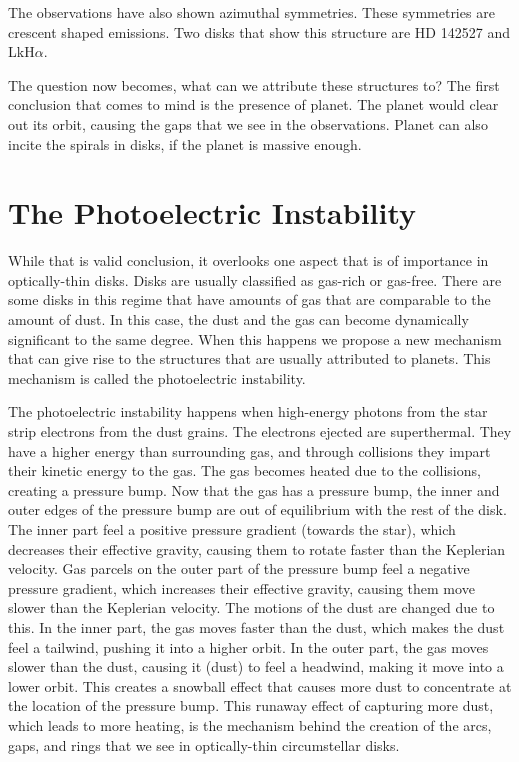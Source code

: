 \documentclass[onecolumn]{report}
\begin{document}
The observations have also shown azimuthal symmetries. These symmetries are crescent shaped emissions. Two disks that show this structure are HD 142527 and LkH$\alpha$. 

The question now becomes, what can we attribute these structures to? The first conclusion that comes to mind is the presence of planet. The planet would clear out its orbit, causing the gaps that we see in the observations. Planet can also incite the spirals in disks, if the planet is massive enough.

\section{The Photoelectric Instability}

While that is valid conclusion, it overlooks one aspect that is of importance in optically-thin disks. Disks are usually classified as gas-rich or gas-free. There are some disks in this regime that have amounts of gas that are comparable to the amount of dust. In this case, the dust and the gas can become dynamically significant to the same degree. When this happens we propose a new mechanism that can give rise to the structures that are usually attributed to planets. This mechanism is called the photoelectric instability.

The photoelectric instability happens when high-energy photons from the star strip electrons from the dust grains. The electrons ejected are superthermal. They have a higher energy than surrounding gas, and through collisions they impart their kinetic energy to the gas. The gas becomes heated due to the collisions, creating a pressure bump. Now that the gas has a pressure bump, the inner and outer edges of the pressure bump are out of equilibrium with the rest of the disk. The inner part feel a positive pressure gradient (towards the star), which decreases their effective gravity, causing them to rotate faster than the Keplerian velocity. Gas parcels on the outer part of the pressure bump feel a negative pressure gradient, which increases their effective gravity, causing them move slower than the Keplerian velocity. The motions of the dust are changed due to this. In the inner part, the gas moves faster than the dust, which makes the dust feel a tailwind, pushing it into a higher orbit. In the outer part, the gas moves slower than the dust, causing it (dust) to feel a headwind, making it move into a lower orbit. This creates a snowball effect that causes more dust to concentrate at the location of the pressure bump. This runaway effect of capturing more dust, which leads to more heating, is the mechanism behind the creation of the arcs, gaps, and rings that we see in optically-thin circumstellar disks.
\end{document}
